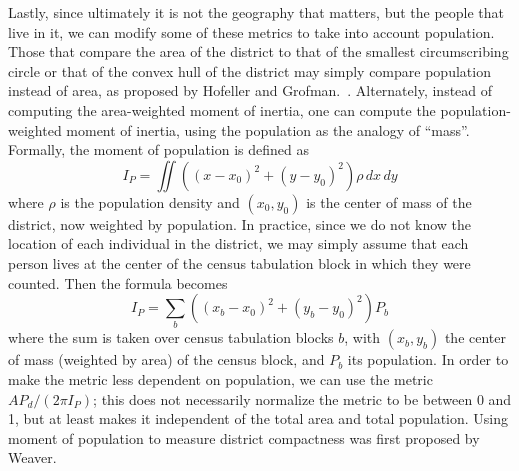 \documentclass[12pt]{article}
\begin{document}
  Lastly, since ultimately it is not the geography that matters, but the people that live in it, we can modify some of these metrics to take into account population.  Those that compare the area of the district to that of the smallest circumscribing circle or that of the convex hull of the district may simply compare population instead of area, as proposed by Hofeller and Grofman.~\cite{hofeller}.  Alternately, instead of computing the area-weighted moment of inertia, one can compute the population-weighted moment of inertia, using the population as the analogy of ``mass''.  Formally, the moment of population is defined as
  \[I_P = \iint \left((x-x_0)^2 + (y-y_0)^2\right) \rho\, dx\, dy \]
  where $\rho$ is the population density and $(x_0, y_0)$ is the center of mass of the district, now weighted by population.  In practice, since we do not know the location of each individual in the district, we may simply assume that each person lives at the center of the census tabulation block in which they were counted.  Then the formula becomes
  \[I_P = \sum_{b} \left((x_b-x_0)^2 + (y_b-y_0)^2\right) P_b\]
  where the sum is taken over census tabulation blocks $b$, with $(x_b, y_b)$ the center of mass (weighted by area) of the census block, and $P_b$ its population.  In order to make the metric less dependent on population, we can use the metric $AP_d/(2\pi I_P)$; this does not necessarily normalize the metric to be between 0 and 1, but at least makes it independent of the total area and total population.  Using moment of population to measure district compactness was first proposed by Weaver.~\cite{weaver}
\end{document}
